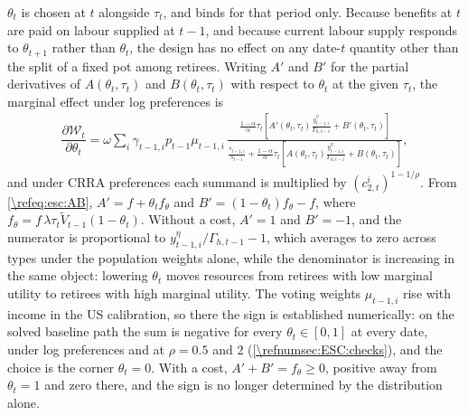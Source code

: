  $\theta_t$ is chosen at $t$ alongside $\tau_t$, and binds for that period only. Because benefits at $t$ are paid on labour supplied at $t-1$, and because current labour supply responds to $\theta_{t+1}$ rather than $\theta_t$, the design has no effect on any date-$t$ quantity other than the split of a fixed pot among retirees. Writing $A'$ and $B'$ for the partial derivatives of $A(\theta_t,\tau_t)$ and $B(\theta_t,\tau_t)$ with respect to $\theta_t$ at the given $\tau_t$, the marginal effect under log preferences is
\begin{align}\label{\refeq:esc:seqFOC}
    \dfrac{\partial \mathcal{W}_t}{\partial \theta_t} = \omega\sum_i\gamma_{t-1,i}p_{t-1}\mu_{t-1,i}\,
    \frac{\frac{1-\alpha}{\alpha}\tau_t\left[A'(\theta_t,\tau_t)\frac{y_{t-1,i}^{\eta}}{\Gamma_{h,t-1}} + B'(\theta_t,\tau_t)\right]}
         {\frac{s_{t-1,i}}{s_{t-1}}+\frac{1-\alpha}{\alpha}\tau_t\left[A(\theta_t,\tau_t)\frac{y_{t-1,i}^{\eta}}{\Gamma_{h,t-1}}+B(\theta_t,\tau_t)\right]},
\end{align}
and under CRRA preferences each summand is multiplied by $\left(c_{2,t}^i\right)^{1-1/\rho}$. From \eqref{\refeq:esc:AB}, $A' = f + \theta_t f_{\theta}$ and $B' = (1-\theta_t)f_{\theta} - f$, where $f_{\theta} = f\,\lambda\tau_t\tilde{V}_{t-1}(1-\theta_t)$. Without a cost, $A' = 1$ and $B' = -1$, and the numerator is proportional to $y_{t-1,i}^{\eta}/\Gamma_{h,t-1}-1$, which averages to zero across types under the population weights alone, while the denominator is increasing in the same object: lowering $\theta_t$ moves resources from retirees with low marginal utility to retirees with high marginal utility. The voting weights $\mu_{t-1,i}$ rise with income in the US calibration, so there the sign is established numerically: on the solved baseline path the sum is negative for every $\theta_t\in[0,1]$ at every date, under log preferences and at $\rho = 0.5$ and $2$ (\cref{\refnumsec:ESC:checks}), and the choice is the corner $\theta_t=0$. With a cost, $A'+B' = f_{\theta}\geq 0$, positive away from $\theta_t=1$ and zero there, and the sign is no longer determined by the distribution alone.

